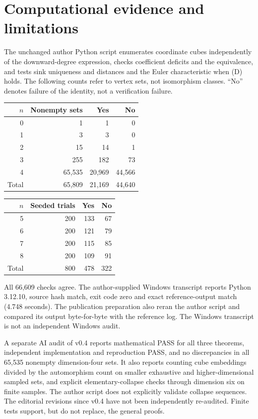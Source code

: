 \documentclass[11pt,a4paper]{article}
\begin{document}
\section{Computational evidence and limitations}
The unchanged author Python script enumerates coordinate cubes independently of the downward-degree expression, checks coefficient deficits and the equivalence, and tests sink uniqueness and distances and the Euler characteristic when (D) holds. The following counts refer to vertex sets, not isomorphism classes. ``No'' denotes failure of the identity, not a verification failure.
\begin{center}\small
\begin{tabular}{rrrr}\toprule
$n$ & Nonempty sets & Yes & No\\\midrule
0&1&1&0\\1&3&3&0\\2&15&14&1\\3&255&182&73\\4&65,535&20,969&44,566\\\midrule
Total&65,809&21,169&44,640\\\bottomrule
\end{tabular}\qquad
\begin{tabular}{rrrr}\toprule
$n$ & Seeded trials & Yes & No\\\midrule
5&200&133&67\\6&200&121&79\\7&200&115&85\\8&200&109&91\\\midrule
Total&800&478&322\\\bottomrule
\end{tabular}
\end{center}
All 66,609 checks agree. The author-supplied Windows transcript reports Python 3.12.10, source hash match, exit code zero and exact reference-output match (4.748 seconds). The publication preparation also reran the author script and compared its output byte-for-byte with the reference log. The Windows transcript is not an independent Windows audit.

A separate AI audit of v0.4 reports mathematical PASS for all three theorems, independent implementation and reproduction PASS, and no discrepancies in all 65,535 nonempty dimension-four sets. It also reports counting cube embeddings divided by the automorphism count on smaller exhaustive and higher-dimensional sampled sets, and explicit elementary-collapse checks through dimension six on finite samples. The author script does not explicitly validate collapse sequences. The editorial revisions since v0.4 have not been independently re-audited. Finite tests support, but do not replace, the general proofs.
\end{document}
